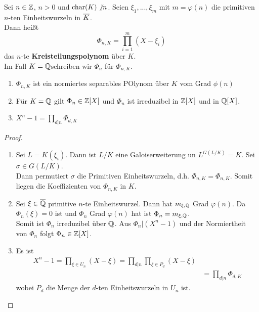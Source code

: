 	\begin{definition}
		Sei $n\in\mathbb{Z}$, $n>0$ und $\operatorname{char}(K)\not|n$. Seien $\xi_1,...,\xi_m$ mit $m=\varphi(n)$ die primitiven $n$-ten Einheitswurzeln in $\overline{K}$.\\
		Dann heißt
		\[\Phi_{n,K}=\prod_{i=1}^{m}(X-\xi_i)\]
		das $n$-te \textbf{Kreisteilungspolynom} über $K$.\\
		Im Fall $K=\mathbb{Q}$schreiben wir $\Phi_n$ für $\Phi_{n,K}$.
	\end{definition}

	\begin{satz}
		\begin{enumerate}
			\item $\Phi_{n,K}$ ist ein normiertes separables POlynom über $K$ vom Grad $\phi(n)$
			\item Für $K=\mathbb{Q}$ gilt $\Phi_n\in\mathbb{Z}[X]$ und $\Phi_n$ ist irreduzibel in $\mathbb{Z}[X]$ und in $\mathbb{Q}[X]$.
			\item $X^n-1=\prod_{d|n}\Phi_{d,K}$
		\end{enumerate}
	\end{satz}
	\begin{proof}
		\begin{enumerate}
			\item Sei $L=K(\xi_i)$. Dann ist $L/K$ eine Galoiserweiterung un $L^{G(L/K)}=K$. Sei $\sigma\in G(L/K)$.\\
			Dann permutiert $\sigma$ die Primitiven Einheitswurzeln, d.h. $\Phi_{n,K}=\Phi_{n,K}$. Somit liegen die Koeffizienten von $\Phi_{n,K}$ in $K$.
			\item Sei $\xi\in\overline{\mathbb{Q}}$ primitive $n$-te Einheitswurzel. Dann hat $m_{\xi,\mathbb{Q}}$ Grad $\varphi(n)$. Da $\Phi_n(\xi)=0$ ist und $\Phi_n$ Grad $\varphi(n)$ hat ist $\Phi_n=m_{\xi,\mathbb{Q}}$.\\
			Somit ist $\Phi_n$ irreduzibel über $\mathbb{Q}$. Aus $\Phi_n|(X^n-1)$ und der Normiertheit von $\Phi_n$ folgt $\Phi_n\in\mathbb{Z}[X]$.
			\item Es ist
			\begin{align*}
			X^n-1=\prod_{\xi\in U_n}(X-\xi)=\prod_{d|n}\prod_{\xi\in P_d}(X-\xi)\\
			&=\prod_{d|n}\Phi_{d,K}
			\end{align*} 
			wobei $P_d$ die Menge der $d$-ten Einheitswurzeln in $U_n$ ist.
		\end{enumerate}
	\end{proof}

